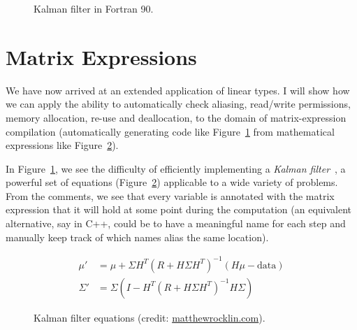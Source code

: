 \begin{landscape}
    \begin{figure}[p]
    \centering
    \begin{minipage}{1.47\textheight}
    \inputminted[linenos, fontsize=\footnotesize]{fortran}{kalman.f90}
    \end{minipage}
    \caption{Kalman filter in Fortran 90.}\label{fig:fortran_kalman}
    \end{figure}
\end{landscape}

\section{Matrix Expressions}\label{sec:matrix_exps}

We have now arrived at an extended application of linear types. I will show how
we can apply the ability to automatically check aliasing, read/write
permissions, memory allocation, re-use and deallocation, to the domain of
matrix-expression compilation (automatically generating code like
Figure~\ref{fig:fortran_kalman} from mathematical expressions like
Figure~\ref{fig:maths_kalman}).

In Figure~\ref{fig:fortran_kalman}, we see the difficulty of efficiently
implementing a \emph{Kalman filter}~\cite{kalman}, a powerful set of equations
(Figure~\ref{fig:maths_kalman}) applicable to a wide variety of problems. From
the comments, we see that every variable is annotated with the matrix
expression that it will hold at some point during the computation (an
equivalent alternative, say in C++, could be to have a meaningful name for each
step and manually keep track of which names alias the same location).

\begin{figure}[tp]
    \begin{align*}
        \mu' &= \mu + \Sigma H^T (R + H \Sigma H^T)^{-1} (H \mu - \textrm{data})\\
        \Sigma' &= \Sigma ( I - H^T (R + H \Sigma H^T)^{-1} H \Sigma )
    \end{align*}
    \caption{Kalman filter equations (credit:
    \href{http://matthewrocklin.com/blog/work/2012/11/24/Kalman-Filter}{matthewrocklin.com}).}\label{fig:maths_kalman}
\end{figure}


